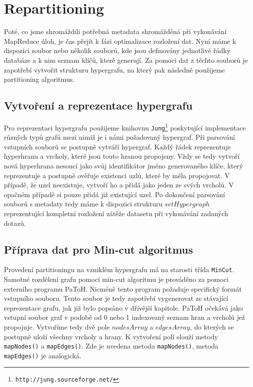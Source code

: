 \documentclass[thesis=M,czech]{FITthesis}[2012/06/26]
\begin{document}
\section{Repartitioning}
Poté, co jsme shromáždili potřebná metadata shromážděná při vykonávání MapReduce úloh, je čas přejít k fázi optimalizace rozložení dat. Nyní máme \linebreak k dispozici soubor nebo několik souborů, kde jsou definovány jednotlivé řádky databáze a k nim seznam klíčů, které generují. Za pomoci dat z těchto souborů je zapotřebí vytvořit strukturu hypergrafu, na který pak následně použijeme partitioning algoritmus.

\subsection{Vytvoření a reprezentace hypergrafu}
Pro reprezentaci hypergrafu použijeme knihovnu \texttt{Jung}\footnote{\texttt{http://jung.sourceforge.net/}} poskytující implementace různých typů grafů mezi nimiž je i námi požadovaný hypergraf. Při parsování vstupních souborů se postupně vytváří hypergraf.  Každý řádek reprezentuje hyperhranu a vrcholy, které jsou touto hranou propojeny. Vždy se tedy vytvoří nová hyperhrana nesoucí jako svůj identifikátor jméno generovaného klíče, který reprezentuje a postupně ověřuje existenci uzlů, které by měla propojovat. V případě, že uzel neexistuje, vytvoří ho a přidá jako jeden ze svých vrcholů. V opačném případě si pouze přidá již existující uzel. Po dokončení parsování souborů s metadaty tedy máme k dispozici strukturu $setHypergraph$ reprezentující kompletní rozložení zátěže datasetu při vykonávání zadaných dotazů.

\subsection{Příprava dat pro Min-cut algoritmus}
Provedení partitioningu na vzniklém hypergrafu má na starosti třída \texttt{MinCut}. Samotné rozdělení grafu pomocí min-cut algoritmu je prováděno za pomoci externího programu PaToH. Nicméně tento program požaduje specifický formát vstupního souboru. Tento soubor je tedy zapotřebí vygenerovat ze stávající reprezentace grafu, jak již bylo popsáno v dřívější kapitole. PaToH očekává jako vstupní soubor graf v podobě od 0 nebo 1 indexovaný seznam hran a vrcholů jež propojuje.  Vytvoříme tedy dvě pole $nodesArray$ a $edgesArray$, do kterých se postupně uloží všechny vrcholy a hrany. K vytvoření polí slouží metody \texttt{mapNodes()} a \texttt{mapEdges()}. Zde je uvedena metoda \texttt{mapNodes()}, metoda \texttt{mapEdges()} je analogická.
\end{document}
